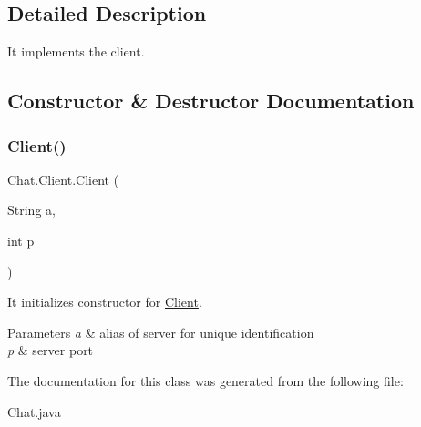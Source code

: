 \subsection{Detailed Description}
It implements the client. 

\subsection{Constructor \& Destructor Documentation}
\mbox{\label{class_chat_1_1_client_a4b7e710445daa791b57d2345ebc97b1e}} 
\subsubsection{\texorpdfstring{Client()}{Client()}}
{\footnotesize\ttfamily Chat.\+Client.\+Client (\begin{DoxyParamCaption}\item[{String}]{a,  }\item[{int}]{p }\end{DoxyParamCaption})}



It initializes constructor for \hyperlink{class_chat_1_1_client}{Client}. 


\begin{DoxyParams}{Parameters}
{\em a} & alias of server for unique identification \\
\hline
{\em p} & server port \\
\hline
\end{DoxyParams}


The documentation for this class was generated from the following file\+:\begin{DoxyCompactItemize}
\item 
Chat.\+java\end{DoxyCompactItemize}
